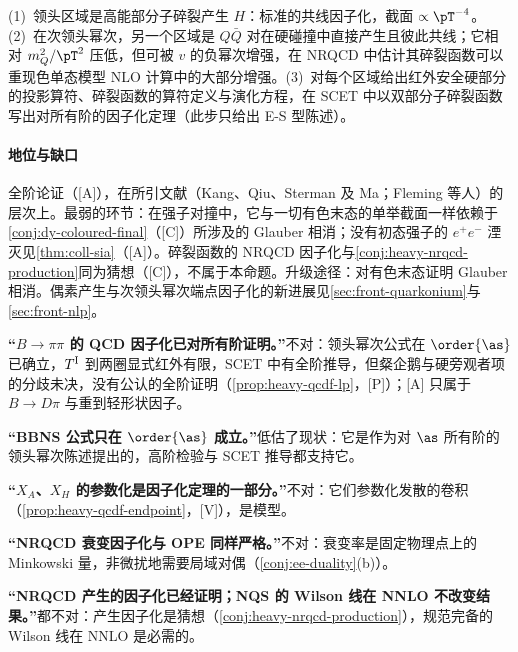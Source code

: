 \begin{proofsketch}
(1)~领头区域是高能部分子碎裂产生 $H$：标准的共线因子化，截面 $\propto\pT^{-4}$。(2)~在次领头幂次，另一个区域是 $Q\bar Q$ 对在硬碰撞中直接产生且彼此共线；它相对 $m_Q^2/\pT^2$ 压低，但可被 $v$ 的负幂次增强\cite{Fleming:2012wy}，在 NRQCD 中估计其碎裂函数可以重现色单态模型 NLO 计算中的大部分增强\cite{Kang:2011mg}。(3)~对每个区域给出红外安全硬部分的投影算符、碎裂函数的算符定义与演化方程\cite{Kang:2014tta}，在 SCET 中以双部分子碎裂函数写出对所有阶的因子化定理\cite{Fleming:2012wy}（此步只给出 E-S 型陈述）。
\end{proofsketch}

\paragraph{地位与缺口}
全阶论证（[A]），在所引文献（Kang、Qiu、Sterman 及 Ma\cite{Kang:2011mg,Kang:2014tta}；Fleming 等人\cite{Fleming:2012wy}）的层次上。最弱的环节：在强子对撞中，它与一切有色末态的单举截面一样依赖于\cref{conj:dy-coloured-final}（[C]）所涉及的 Glauber 相消；没有初态强子的 $e^+e^-$ 湮灭见\cref{thm:coll-sia}（[A]）。碎裂函数的 NRQCD 因子化与\cref{conj:heavy-nrqcd-production}同为猜想（[C]），不属于本命题。升级途径：对有色末态证明 Glauber 相消。偶素产生与次领头幂次端点因子化的新进展见\cref{sec:front-quarkonium}与\cref{sec:front-nlp}。

\begin{tcolorbox}[enhanced,breakable,title=常见误解,fonttitle=\bfseries,
  colback=gray!3!white,colframe=gray!55!black,boxrule=0.6pt,arc=2pt,
  left=5pt,right=5pt,top=3pt,bottom=3pt,before skip=6pt,after skip=6pt]
\textbf{“$B\to\pi\pi$ 的 QCD 因子化已对所有阶证明。”}不对：领头幂次公式在 $\order{\as}$ 已确立，$T^{\rm I}$ 到两圈显式红外有限，SCET 中有全阶推导，但粲企鹅与硬旁观者项的分歧未决，没有公认的全阶证明（\cref{prop:heavy-qcdf-lp}，[P]）；[A] 只属于 $B\to D\pi$ 与重到轻形状因子。\par
\textbf{“BBNS 公式只在 $\order{\as}$ 成立。”}低估了现状：它是作为对 $\as$ 所有阶的领头幂次陈述提出的，高阶检验与 SCET 推导都支持它。\par
\textbf{“$X_A$、$X_H$ 的参数化是因子化定理的一部分。”}不对：它们参数化发散的卷积（\cref{prop:heavy-qcdf-endpoint}，[V]），是模型。\par
\textbf{“NRQCD 衰变因子化与 OPE 同样严格。”}不对：衰变率是固定物理点上的 Minkowski 量，非微扰地需要局域对偶（\cref{conj:ee-duality}(b)）。\par
\textbf{“NRQCD 产生的因子化已经证明；NQS 的 Wilson 线在 NNLO 不改变结果。”}都不对：产生因子化是猜想（\cref{conj:heavy-nrqcd-production}），规范完备的 Wilson 线在 NNLO 是必需的。
\end{tcolorbox}

